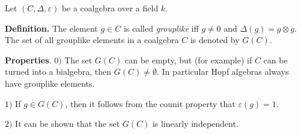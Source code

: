 \documentclass[12pt]{article}
\begin{document}
Let $(C,\Delta,\varepsilon)$ be a coalgebra over a field $k$.

\textbf{Definition.} The element $g\in C$ is called \textit{grouplike} iff $g\neq 0$ and $\Delta(g)=g\otimes g$. The set of all grouplike elements in a coalgebra $C$ is denoted by $G(C)$.

\textbf{Properties}. $0)$ The set $G(C)$ can be empty, but (for example) if $C$ can be turned into a bialgebra, then $G(C)\neq\emptyset$. In particular Hopf algebras always have grouplike elements.

$1)$ If $g\in G(C)$, then it follows from the counit property that $\varepsilon(g)=1$.

$2)$ It can be shown that the set $G(C)$ is linearly independent.
\end{document}
